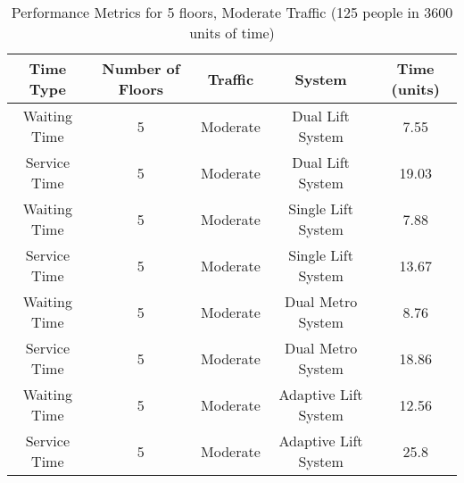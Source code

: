 \documentclass[12pt,a4paper]{report}
\begin{document}
\begin{table}[H]
\centering
\begin{tabular}{|c|c|c|c|c|}
\hline
\textbf{Time Type}    & \textbf{Number of Floors} & \textbf{Traffic} & \textbf{System}     & \textbf{Time (units)} \\ \hline
Waiting Time         & 5                     & Moderate         & Dual Lift System               & 7.55               \\ \hline
Service Time         & 5                     & Moderate         & Dual Lift System               & 19.03              \\ \hline
Waiting Time         & 5                     & Moderate         & Single Lift System & 7.88               \\ \hline
Service Time         & 5                     & Moderate         & Single Lift System             & 13.67              \\ \hline
Waiting Time         & 5                     & Moderate         & Dual Metro System         & 8.76               \\ \hline
Service Time         & 5                     & Moderate         & Dual Metro System         & 18.86              \\ \hline
Waiting Time         & 5                     & Moderate             & Adaptive Lift System         & 12.56             \\ \hline
Service Time         & 5                     & Moderate         & Adaptive Lift System         & 25.8             \\ \hline
\end{tabular}
\caption{Performance Metrics for 5 floors, Moderate Traffic (125 people in 3600 units of time)}
\end{table}
\end{document}
